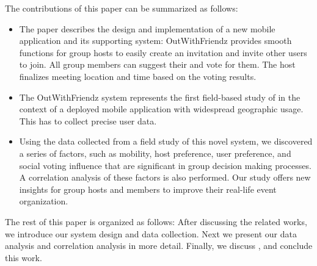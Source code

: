 The contributions of this paper can be summarized as follows:
\begin{itemize}
\item The paper describes the design and implementation of a new mobile   
application  and its supporting system: OutWithFriendz provides smooth functions for group hosts to 
easily create an invitation and invite other users to join. All group members can 
suggest their  and vote for them. The host finalizes meeting 
location and time based on the voting results.

\item The OutWithFriendz system represents the first field-based study of
in the context of a deployed mobile application with widespread geographic
usage. This has  to collect precise
user  data.

\item Using the data collected from a field study of this novel system,
we discovered a series of
factors, such as
mobility, host preference, user preference, and social voting influence that
are significant in group  decision
making processes.
A correlation analysis of these factors is also performed. Our study offers
new insights for group hosts and members to improve their real-life
event organization.
\end{itemize}
The rest of this paper is organized as follows: After discussing the related
works, we introduce our system design and data collection. Next we present our
data analysis and correlation analysis in more detail.
Finally, we 
discuss , and conclude this work.

